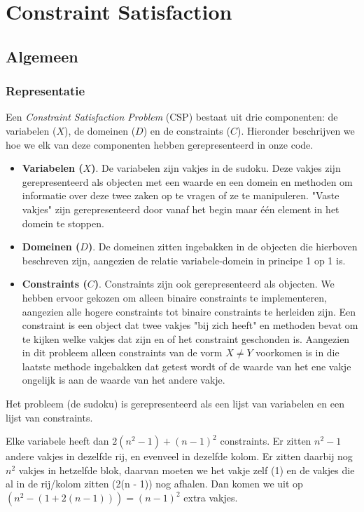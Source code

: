 \documentclass[]{report}
\begin{document}
\section{Constraint Satisfaction}
\subsection{Algemeen}
\subsubsection{Representatie}
Een \textit{Constraint Satisfaction Problem} (CSP) bestaat uit drie componenten: de variabelen ($X$), de domeinen ($D$) en de constraints ($C$). Hieronder beschrijven we hoe we elk van deze componenten hebben gerepresenteerd in onze code.
\begin{itemize}
\item \textbf{Variabelen ($X$)}. De variabelen zijn vakjes in de sudoku. Deze vakjes zijn gerepresenteerd als objecten met een waarde en een domein en methoden om informatie over deze twee zaken op te vragen of ze te manipuleren. "Vaste vakjes" zijn gerepresenteerd door vanaf het begin maar één element in het domein te stoppen.
\item \textbf{Domeinen ($D$)}. De domeinen zitten ingebakken in de objecten die hierboven beschreven zijn, aangezien de relatie variabele-domein in principe 1 op 1 is.
\item \textbf{Constraints ($C$)}. Constraints zijn ook gerepresenteerd als objecten. We hebben ervoor gekozen om alleen binaire constraints te implementeren, aangezien alle hogere constraints tot binaire constraints te herleiden zijn. Een constraint is een object dat twee vakjes "bij zich heeft" en methoden bevat om te kijken welke vakjes dat zijn en of het constraint geschonden is. Aangezien in dit probleem alleen constraints van de vorm $ X \not= Y $ voorkomen is in die laatste methode ingebakken dat getest wordt of de waarde van het ene vakje ongelijk is aan de waarde van het andere vakje.
\end{itemize}
Het probleem (de sudoku) is gerepresenteerd als een lijst van variabelen en een lijst van constraints.

Elke variabele heeft dan $2(n^2 - 1) + (n - 1)^2$ constraints. Er zitten $n^2 - 1$ andere vakjes in dezelfde rij, en evenveel in dezelfde kolom. Er zitten daarbij nog $n^2$ vakjes in hetzelfde blok, daarvan moeten we  het vakje zelf (1) en de vakjes die al in de rij/kolom zitten (2(n - 1)) nog afhalen. Dan komen we uit op $(n^2 - (1 + 2(n - 1))) = (n - 1)^2$ extra vakjes.
\end{document}
